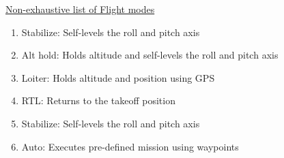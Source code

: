 \underline{Non-exhaustive list of Flight modes}

\begin{enumerate}

    \item Stabilize: Self-levels the roll and pitch axis
    
    \item Alt hold: Holds altitude and self-levels the roll and pitch axis
    
    \item Loiter: Holds altitude and position using GPS
    
    \item RTL: Returns to the takeoff position
    
    \item Stabilize: Self-levels the roll and pitch axis
    
    \item Auto: Executes pre-defined mission using waypoints
    
\end{enumerate}
